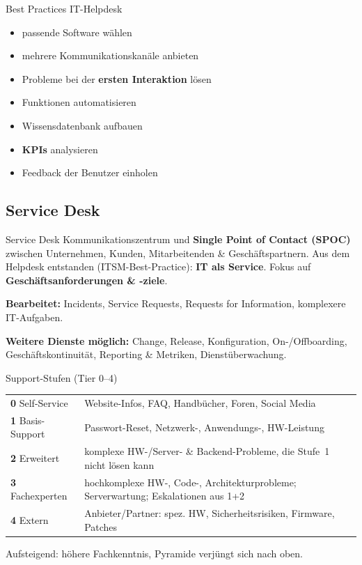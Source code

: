 \documentclass[a4paper, fontsize=7pt]{scrartcl}
\renewcommand*{\arraystretch}{1.5}  %
\begin{document}
\begin{mainbox}{Best Practices IT-Helpdesk}
\begin{itemize}
    \item passende Software wählen
    \item mehrere Kommunikationskanäle anbieten
    \item Probleme bei der \textbf{ersten Interaktion} lösen
    \item Funktionen automatisieren
    \item Wissensdatenbank aufbauen
    \item \textbf{KPIs} analysieren
    \item Feedback der Benutzer einholen
\end{itemize}
\end{mainbox}

\subsection{Service Desk}

\begin{mainbox}{Service Desk}
Kommunikationszentrum und \textbf{Single Point of Contact (SPOC)} zwischen
Unternehmen, Kunden, Mitarbeitenden \& Geschäftspartnern. Aus dem Helpdesk
entstanden (ITSM-Best-Practice): \textbf{IT als Service}. Fokus auf
\textbf{Geschäftsanforderungen \& -ziele}.

\textbf{Bearbeitet:} Incidents, Service Requests, Requests for Information,
komplexere IT-Aufgaben.

\textbf{Weitere Dienste möglich:} Change, Release, Konfiguration, On-/Offboarding,
Geschäftskontinuität, Reporting \& Metriken, Dienstüberwachung.
\end{mainbox}

\begin{mainbox}{Support-Stufen (Tier 0--4)}
\renewcommand*{\arraystretch}{1.15}
\begin{tabularx}{\linewidth}{@{}l>{\raggedright\arraybackslash}X@{}}
\textbf{0} Self-Service & Website-Infos, FAQ, Handbücher, Foren, Social Media \\
\textbf{1} Basis-Support & Passwort-Reset, Netzwerk-, Anwendungs-,
  HW-Leistung \\
\textbf{2} Erweitert & komplexe HW-/Server- \& Backend-Probleme, die Stufe~1
  nicht lösen kann \\
\textbf{3} Fachexperten & hochkomplexe HW-, Code-, Architekturprobleme;
  Serverwartung; Eskalationen aus 1+2 \\
\textbf{4} Extern & Anbieter/Partner: spez. HW, Sicherheitsrisiken, Firmware,
  Patches \\
\end{tabularx}
Aufsteigend: höhere Fachkenntnis, Pyramide verjüngt sich nach oben.
\end{mainbox}
\end{document}
